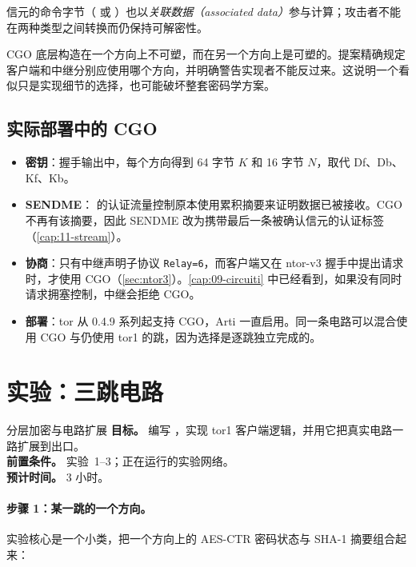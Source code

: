 信元的命令字节（ 或 ）也以\emph{关联数据（associated data）}参与计算；攻击者不能在两种类型之间转换而仍保持可解密性。

\begin{attenzione}[两个方向不能随意互换]
CGO 底层构造在一个方向上不可塑，而在另一个方向上是可塑的。提案精确规定客户端和中继分别应使用哪个方向，并明确警告实现者不能反过来。这说明一个看似只是实现细节的选择，也可能破坏整套密码学方案。
\end{attenzione}

\subsection{实际部署中的 CGO}

\begin{itemize}
  \item \textbf{密钥}：握手输出中，每个方向得到 64 字节 $K$ 和 16 字节 $N$，取代 Df、Db、Kf、Kb。
  \item \textbf{SENDME}： 的认证流量控制原本使用累积摘要来证明数据已被接收。CGO 不再有该摘要，因此 SENDME 改为携带最后一条被确认信元的认证标签（\cref{cap:11-stream}）。
  \item \textbf{协商}：只有中继声明子协议 \texttt{Relay=6}，而客户端又在 ntor-v3 握手中提出请求时，才使用 CGO（\cref{sec:ntor3}）。\cref{cap:09-circuiti} 中已经看到，如果没有同时请求拥塞控制，中继会拒绝 CGO。
  \item \textbf{部署}：tor 从 0.4.9 系列起支持 CGO，Arti 一直启用。同一条电路可以混合使用 CGO 与仍使用 tor1 的跳，因为选择是逐跳独立完成的。
\end{itemize}

\section{实验：三跳电路}\label{sec:lab-cifratura}

\begin{laboratorio}[4]{分层加密与电路扩展}
\textbf{目标。} 编写 ，实现 tor1 客户端逻辑，并用它把真实电路一路扩展到出口。\\
\textbf{前置条件。} 实验~1--3；正在运行的实验网络。\\
\textbf{预计时间。} 3 小时。
\end{laboratorio}

\paragraph{步骤 1：某一跳的一个方向。} 实验核心是一个小类，把一个方向上的 AES-CTR 密码状态与 SHA-1 摘要组合起来：

